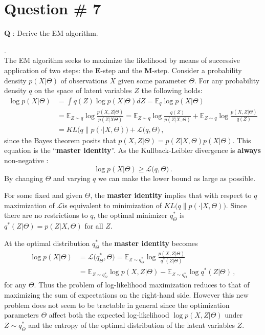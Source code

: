 \documentclass[a4paper]{article}
\begin{document}
\clearpage

\section{Question \# 7} %
\label{sec:question_7}
\textbf{\large \textbf{Q}} : Derive the EM algorithm.

 .\hfill\\
The EM algorithm seeks to maximize the likelihood by means of successive application
of two steps: the \textbf{E}-step and the \textbf{M}-step. Consider a probability
density $p(X|\Theta)$ of observations $X$ given some parameter $\Theta$. For any
probability density $q$ on the space of latent variables $Z$ the following holds:  
\begin{align*}
\log p(X|\Theta)
    &= \int q(Z) \log p(X|\Theta) dZ
     = \mathbb{E}_q \log p(X|\Theta) \\
    &= \mathbb{E}_{Z\sim q} \log \frac{p(X,Z|\Theta)}{p(Z|X\Theta)}
     = \mathbb{E}_{Z\sim q} \log \frac{q(Z)}{p(Z|X,\Theta)}
     + \mathbb{E}_{Z\sim q} \log \frac{p(X,Z|\Theta)}{q(Z)} \\ 
    &= KL\bigl(q\|p(\cdot|X,\Theta)\bigr) + \mathcal{L}\bigl(q, \Theta\bigr)\,,
\end{align*}
since the Bayes theorem posits that $p(X,Z|\Theta) = p(Z|X,\Theta) p(X|\Theta)$.
This equation is the ``\textbf{master identity}''. As the Kullback-Leibler divergence
is \textbf{always} non-negative :
\[ \log p(X|\Theta) \geq \mathcal{L}\bigl(q, \Theta\bigr) \,. \]
By changing $\Theta$ and varying $q$ we can make the lower bound as large as possible.

For some fixed and given $\Theta$, the \textbf{master identity} implies that with
respect to $q$ maximization of $\mathcal{L}$is equivalent to minimization of
$KL\bigl(q\|p(\cdot|X,\Theta)\bigr)$. Since there are no restrictions to $q$, the
optimal minimizer $q^*_\Theta$ is $q^*(Z|\Theta) = p(Z|X,\Theta)$ for all $Z$.

At the optimal distribution $q^*_\Theta$ the \textbf{master identity} becomes
\begin{align*}
\log p(X|\Theta)
&= \mathcal{L}\bigl(q^*_\Theta, \Theta\bigr)
= \mathbb{E}_{Z\sim q^*_\Theta} \log \frac{p(X,Z|\Theta)}{q^*(Z|\Theta)} \\
&= \mathbb{E}_{Z\sim q^*_\Theta} \log p(X,Z|\Theta) - \mathbb{E}_{Z\sim q^*_\Theta} \log q^*(Z|\Theta) \,,
\end{align*}
for any $\Theta$. Thus the problem of log-likelihood maximization reduces to that
of maximizing the sum of expectations on the right-hand side. However this new problem
does not seem to be tractable in general since the optimization parameters $\Theta$
affect both the expected log-likelihood $\log p(X,Z|\Theta)$ under $Z\sim q^*_\Theta$
and the entropy of the optimal distribution of the latent variables $Z$.
\end{document}

